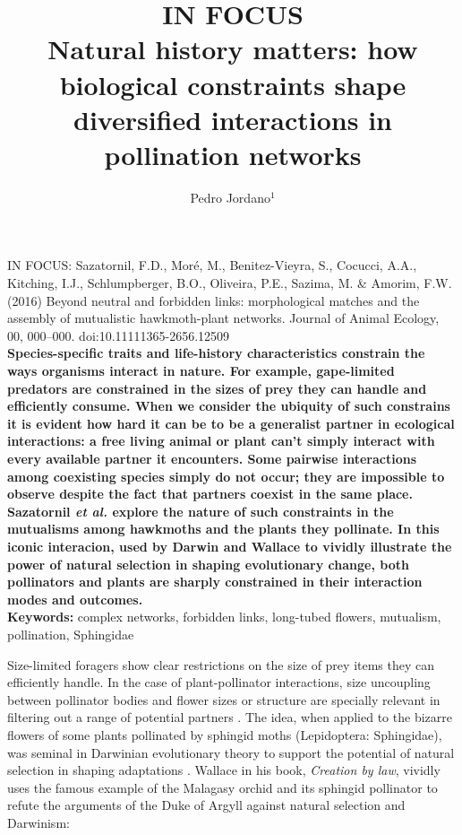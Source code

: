 \documentclass[a4paper,12pt]{article}
\title{IN FOCUS \\ Natural history matters: how biological constraints shape diversified interactions in pollination networks}
\author{Pedro Jordano$^{1}$}
\begin{document}
\maketitle

  \noindent 
  IN FOCUS: Sazatornil, F.D., Moré, M., Benitez-Vieyra, S., Cocucci, A.A., Kitching, I.J., Schlumpberger, B.O., Oliveira, P.E., Sazima, M. \& Amorim, F.W. (2016) Beyond neutral and forbidden links: morphological matches and the assembly of mutualistic hawkmoth-plant networks. Journal of Animal Ecology, 00, 000–000. doi:10.1111\/1365-2656.12509 \\
  
  \textbf{Species-specific traits and life-history characteristics constrain the ways organisms interact in nature. For example, gape-limited predators are constrained in the sizes of prey they can handle and efficiently consume. When we consider the ubiquity of such constrains it is evident how hard it can be to be a generalist partner in ecological interactions: a free living animal or plant can't simply interact with every available partner it encounters. Some pairwise interactions among coexisting species simply do not occur; they are impossible to observe despite the fact that partners coexist in the same place. Sazatornil \textit{et al.} \citep{Sazatornil:2016} explore the nature of such constraints in the mutualisms among hawkmoths and the plants they pollinate. In this iconic interacion, used by Darwin and Wallace to vividly illustrate the power of natural selection in shaping evolutionary change, both pollinators and plants are sharply constrained in their interaction modes and outcomes. } \\

\noindent \textbf{Keywords:} complex networks, forbidden links, long-tubed flowers, mutualism, pollination, Sphingidae

\newpage

Size-limited foragers show clear restrictions on the size of prey items they can efficiently handle. In the case of plant-pollinator interactions, size uncoupling between pollinator bodies and flower sizes or structure are specially relevant in filtering out a range of potential partners \citep{Cocucci:2009}. The idea, when applied to the bizarre flowers of some plants pollinated by sphingid moths (Lepidoptera: Sphingidae), was seminal in Darwinian evolutionary theory to support the potential of natural selection in shaping adaptations \citep{Arditti:2012}. Wallace \citep{Wallace:1867} in his book, \textit{Creation by law}, vividly uses the famous example of the Malagasy orchid and its sphingid pollinator to refute the arguments of the Duke of Argyll against natural selection and Darwinism:
\end{document}
